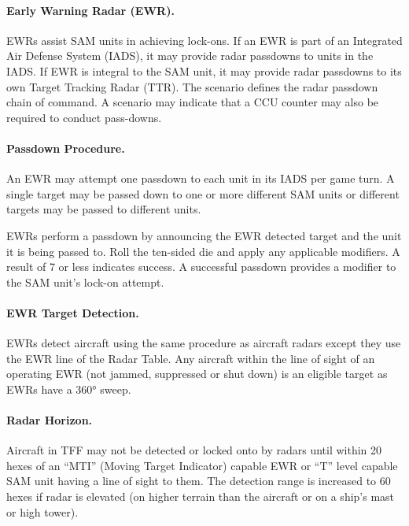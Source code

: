 

    \paragraph{Early Warning Radar (EWR).} EWRs assist SAM units in achieving lock-ons. If an EWR is part of an Integrated Air Defense System (IADS), it may provide radar passdowns to units in the IADS. If EWR is integral to the SAM unit, it may provide radar passdowns to its own Target Tracking Radar (TTR). The scenario defines the radar passdown chain of command. A scenario may indicate that a CCU counter may also be required to conduct pass-downs.

\paragraph{Passdown Procedure.} An EWR may attempt one passdown to each unit in its IADS per game turn. A single target may be passed down to one or more different SAM units or different targets may be passed to different units.

EWRs perform a passdown by announcing the EWR detected target and the unit it is being passed to. Roll the ten-sided die and apply any applicable modifiers. A result of 7 or less indicates success. A successful passdown provides a  modifier to the SAM unit's lock-on attempt.

\paragraph{EWR Target Detection.} EWRs detect aircraft using the same procedure as aircraft radars except they use the EWR line of the Radar Table. Any aircraft within the line of sight of an operating EWR (not jammed, suppressed or shut down) is an eligible target as EWRs have a 360° sweep.  



\paragraph{Radar Horizon.} Aircraft in TFF may not be detected or locked onto by radars until within 20 hexes of an “MTI” (Moving Target Indicator) capable EWR or “T” level capable SAM unit having a line of sight to them. The detection range is increased to 60 hexes if radar is elevated (on higher terrain than the aircraft or on a ship’s mast or high tower).

